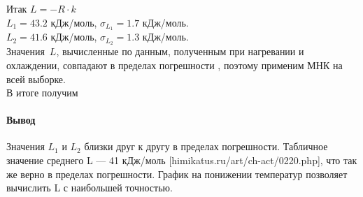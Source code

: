 \documentclass{letnab}
\begin{document}
Итак $L = -R \cdot k$\\
$L_1 = 43.2$ кДж/моль, $\sigma_{L_1} = 1.7$ кДж/моль.\\
$L_2 = 41.6$ кДж/моль, $\sigma_{L_2} = 1.3$ кДж/моль.\\
Значения~$L$, вычисленные по данным, полученным при нагревании и охлаждении,
совпадают в пределах погрешности , поэтому применим МНК на всей выборке.\\
\Large В итоге получим  \normalsize 
\paragraph{Вывод}Значения $L_1$ и $L_2$ близки друг к другу в пределах погрешности. Табличное значение среднего L --- 41 кДж/моль [himikatus.ru/art/ch-act/0220.php], что так же верно в пределах погрешности. График на понижении температур позволяет вычислить L с наибольшей точностью.
\end{document}
